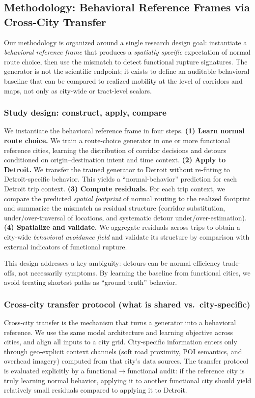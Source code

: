 \subsection{Methodology: Behavioral Reference Frames via Cross-City Transfer}
Our methodology is organized around a single research design goal: instantiate a \emph{behavioral reference frame} that produces a \emph{spatially specific} expectation of normal route choice, then use the mismatch to detect functional rupture signatures. The generator is not the scientific endpoint; it exists to define an auditable behavioral baseline that can be compared to realized mobility at the level of corridors and maps, not only as city-wide or tract-level scalars.

\subsubsection{Study design: construct, apply, compare}
We instantiate the behavioral reference frame in four steps.
\textbf{(1) Learn normal route choice.} We train a route-choice generator in one or more functional reference cities, learning the distribution of corridor decisions and detours conditioned on origin--destination intent and time context.
\textbf{(2) Apply to Detroit.} We transfer the trained generator to Detroit without re-fitting to Detroit-specific behavior. This yields a ``normal-behavior'' prediction for each Detroit trip context.
\textbf{(3) Compute residuals.} For each trip context, we compare the predicted \emph{spatial footprint} of normal routing to the realized footprint and summarize the mismatch as residual structure (corridor substitution, under/over-traversal of locations, and systematic detour under/over-estimation).
\textbf{(4) Spatialize and validate.} We aggregate residuals across trips to obtain a city-wide \emph{behavioral avoidance field} and validate its structure by comparison with external indicators of functional rupture.

This design addresses a key ambiguity: detours can be normal efficiency trade-offs, not necessarily symptoms. By learning the baseline from functional cities, we avoid treating shortest paths as ``ground truth'' behavior.

\subsubsection{Cross-city transfer protocol (what is shared vs.\ city-specific)}
Cross-city transfer is the mechanism that turns a generator into a behavioral reference. We use the same model architecture and learning objective across cities, and align all inputs to a city grid. City-specific information enters only through geo-explicit context channels (soft road proximity, POI semantics, and overhead imagery) computed from that city's data sources. The transfer protocol is evaluated explicitly by a functional$\to$functional audit: if the reference city is truly learning normal behavior, applying it to another functional city should yield relatively small residuals compared to applying it to Detroit.

